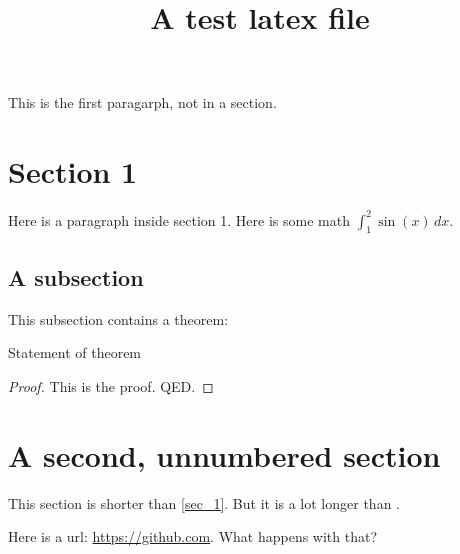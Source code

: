 \documentclass{article}
\begin{document}
\title{A test latex file}

This is the first paragarph, not in a section.

\section{Section 1}\label{sec-1}

Here is a paragraph inside section 1.  Here is some math $\int_1^2 \sin(x)\, dx$.

\subsection{A subsection}

This subsection contains a theorem:

\begin{theorem}
Statement of theorem
\end{theorem}

\begin{proof}
This is the proof.  QED.
\end{proof}

\section*{A second, unnumbered section}\label{sec-2}

This section is shorter than \ref{sec_1}.  But it is a lot longer than \cite{test-cite}.

Here is a url: \url{https://github.com}.  What happens with that?
\end{document}
